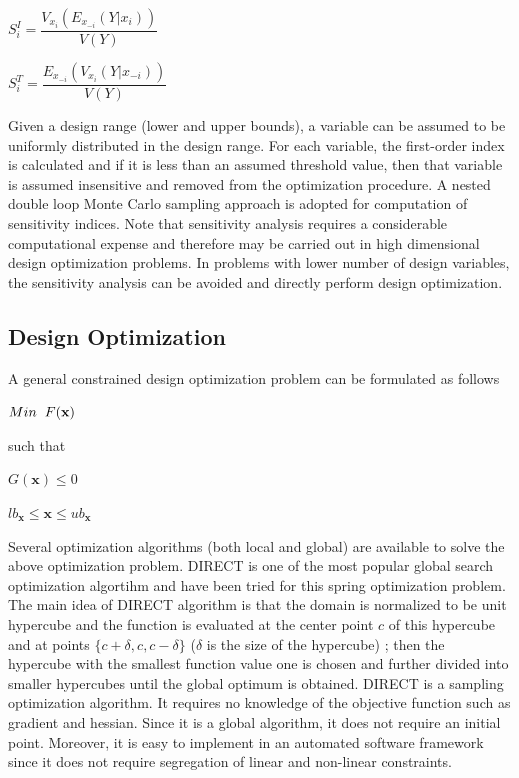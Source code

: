 \documentclass[10pt]{article}
\begin{document}
\centerline{$S_{i}^{I} = \dfrac{V_{x_i}(E_{x_{-i}}(Y|x_{i}))}{V(Y)}$}
\centerline{$S_{i}^{T} = \dfrac{E_{x_{-i}}(V_{x_{i}}(Y|x_{-i}))}{V(Y)}$}

Given a design range (lower and upper bounds), a variable can be assumed to be uniformly distributed in the design range. For each variable, the first-order index is calculated and if it is less than an assumed threshold value, then that variable is assumed insensitive and removed from the optimization procedure. A nested double loop Monte Carlo sampling approach is adopted for computation of sensitivity indices. Note that sensitivity analysis requires a considerable computational expense and therefore may be carried out in high dimensional design optimization problems. In problems with lower number of design variables, the sensitivity analysis can be avoided and directly perform design optimization. 

\subsection{Design Optimization}
\label{subsec:Optimization}
\hspace{5 mm} A general constrained design optimization problem can be formulated as follows

\centerline{$Min \hspace{2 mm} F(\textbf{x})$}
such that

\centerline{$G(\textbf{x}) \leq 0$}
\centerline{$lb_{\textbf{x}} \leq \textbf{x} \leq ub_{\textbf{x}}$}

\noindent  Several optimization algorithms (both local and global) are available to solve the above optimization problem. DIRECT is one of the most popular global search optimization algortihm \cite{DirectUserGuide} and   \cite{DirectPaper} have been tried for this spring optimization problem.\\

The main idea of DIRECT algorithm is that  the domain is normalized to be unit hypercube and the function is evaluated at the center point $c$ of this hypercube and at points $\{c + \delta, c, c - \delta\} $ ($\delta$ is the size of the hypercube) ; then the hypercube with the smallest function value one is chosen and further divided into smaller hypercubes until the global optimum is obtained. DIRECT is a sampling optimization algorithm. It requires no knowledge of the objective function such as gradient and hessian. Since it is a global algorithm, it does not require an initial point.  Moreover, it is easy to implement in an automated software framework since it does not require segregation of linear and non-linear constraints.
\end{document}
